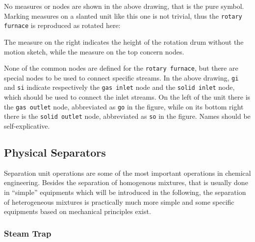 \documentclass[12pt]{article}						%
\newcommand*{\chpn}[1]{\texttt{#1}}				%
\newcommand*{\chpp}[1]{\texttt{#1}}				%
\begin{document}
No measures or nodes are shown in the above drawing, that is the pure symbol.
Marking measures on a slanted unit like this one is not trivial, thus the
\chpp{rotary furnace} is reproduced as rotated here:
\begin{center}
\end{center}
The measure on the right indicates the height of the rotation drum without the
motion sketch, while the measure on the top concern nodes.

None of the common nodes are defined for the \chpn{rotary furnace}, but there are
special nodes to be used to connect specific streams. In the above drawing,
\chpn{gi} and \chpn{si} indicate respectively the \chpn{gas inlet} node and the
\chpn{solid inlet} node, which should be used to connect the inlet streams. On
the left of the unit there is the \chpn{gas outlet} node, abbreviated as
\chpn{go} in the figure, while on its bottom right there is the
\chpn{solid outlet} node, abbreviated as \chpn{so} in the figure. Names should be
self-explicative.

\subsection{Physical Separators}

Separation unit operations are some of the most important operations in chemical
engineering. Besides the separation of homogenous mixtures, that is usually done
in ``simple'' equipments which will be introduced in the following, the
separation of heterogeneous mixtures is practically much more simple and some
specific equipments based on mechanical principles exist.

\subsubsection{Steam Trap}
\end{document}
